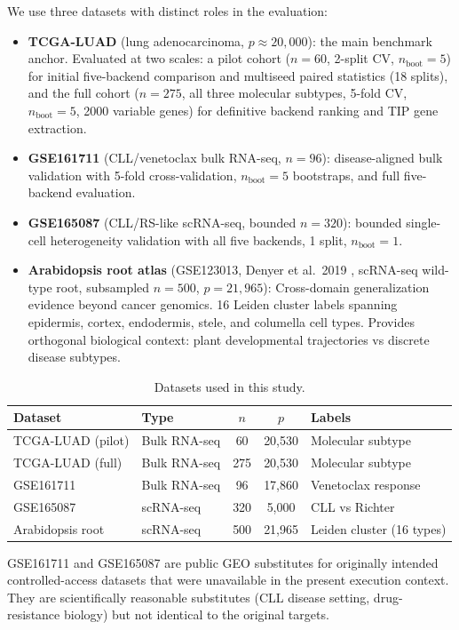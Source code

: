\documentclass[11pt]{article}
\begin{document}
We use three datasets with distinct roles in the evaluation:
\begin{itemize}[leftmargin=1.5em]
\item \textbf{TCGA-LUAD} (lung adenocarcinoma, $p \approx 20{,}000$): the main benchmark anchor.
Evaluated at two scales: a pilot cohort ($n = 60$, 2-split CV, $n_{\text{boot}} = 5$) for initial five-backend comparison and multiseed paired statistics (18 splits), and the full cohort ($n = 275$, all three molecular subtypes, 5-fold CV, $n_{\text{boot}} = 5$, 2000 variable genes) for definitive backend ranking and TIP gene extraction.
\item \textbf{GSE161711} (CLL/venetoclax bulk RNA-seq, $n = 96$): disease-aligned bulk validation with 5-fold cross-validation, $n_{\text{boot}} = 5$ bootstraps, and full five-backend evaluation.
\item \textbf{GSE165087} (CLL/RS-like scRNA-seq, bounded $n = 320$): bounded single-cell heterogeneity validation with all five backends, 1 split, $n_{\text{boot}} = 1$.
\item \textbf{Arabidopsis root atlas} (GSE123013, Denyer et al.\ 2019 \cite{denyer2019}, scRNA-seq wild-type root, subsampled $n = 500$, $p = 21{,}965$): Cross-domain generalization evidence beyond cancer genomics. 16 Leiden cluster labels spanning epidermis, cortex, endodermis, stele, and columella cell types. Provides orthogonal biological context: plant developmental trajectories vs discrete disease subtypes.
\end{itemize}

\begin{table}[h]
\centering\small
\begin{tabular}{llccl}
\toprule
Dataset & Type & $n$ & $p$ & Labels \\
\midrule
TCGA-LUAD (pilot) & Bulk RNA-seq & 60 & 20,530 & Molecular subtype \\
TCGA-LUAD (full) & Bulk RNA-seq & 275 & 20,530 & Molecular subtype \\
GSE161711 & Bulk RNA-seq & 96 & 17,860 & Venetoclax response \\
GSE165087 & scRNA-seq & 320 & 5,000 & CLL vs Richter \\
Arabidopsis root & scRNA-seq & 500 & 21,965 & Leiden cluster (16 types) \\
\bottomrule
\end{tabular}
\caption{Datasets used in this study.}
\label{tab:datasets}
\end{table}

GSE161711 and GSE165087 are public GEO substitutes for originally intended controlled-access datasets that were unavailable in the present execution context.
They are scientifically reasonable substitutes (CLL disease setting, drug-resistance biology) but not identical to the original targets.
\end{document}
